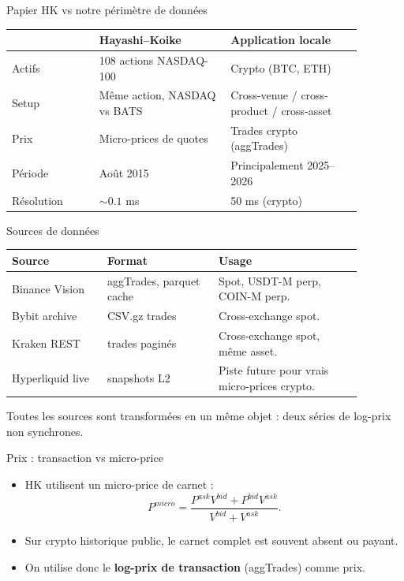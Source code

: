 \documentclass[10pt,aspectratio=169]{beamer}
\begin{document}
\begin{frame}{Papier HK vs notre périmètre de données}
  \small
  \begin{tabular}{p{0.22\linewidth}p{0.33\linewidth}p{0.33\linewidth}}
    \toprule
    & \textbf{Hayashi--Koike} & \textbf{Application locale} \\
    \midrule
    Actifs & 108 actions NASDAQ-100 & Crypto (BTC, ETH) \\
    Setup & Même action, NASDAQ vs BATS & Cross-venue / cross-product / cross-asset \\
    Prix & Micro-prices de quotes & Trades crypto (aggTrades) \\
    Période & Août 2015 & Principalement 2025--2026 \\
    Résolution & \(\sim 0.1\) ms & 50 ms (crypto) \\
    \bottomrule
  \end{tabular}
\end{frame}

\begin{frame}{Sources de données}
  \small
  \begin{tabular}{p{0.24\linewidth}p{0.28\linewidth}p{0.36\linewidth}}
    \toprule
    \textbf{Source} & \textbf{Format} & \textbf{Usage} \\
    \midrule
    Binance Vision & aggTrades, parquet cache & Spot, USDT-M perp, COIN-M perp. \\
    Bybit archive & CSV.gz trades & Cross-exchange spot. \\
    Kraken REST & trades paginés & Cross-exchange spot, même asset. \\
    Hyperliquid live & snapshots L2 & Piste future pour vrais micro-prices crypto. \\
    \bottomrule
  \end{tabular}

  \vspace{0.35cm}
  \normalsize
  Toutes les sources sont transformées en un même objet : deux séries de log-prix non synchrones.
\end{frame}

\begin{frame}{Prix : transaction vs micro-price}
  \begin{itemize}
    \item HK utilisent un micro-price de carnet :
    \[
      P^{micro}
      =
      \frac{P^{ask}V^{bid}+P^{bid}V^{ask}}
      {V^{bid}+V^{ask}}.
    \]
    \item Sur crypto historique public, le carnet complet est souvent absent ou payant.
    \item On utilise donc le \textbf{log-prix de transaction} (aggTrades) comme prix.
  \end{itemize}
\end{frame}
\end{document}
